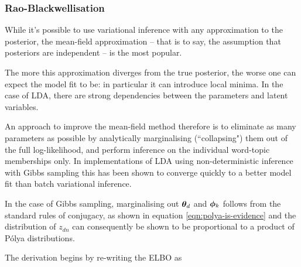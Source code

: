 \subsubsection{Rao-Blackwellisation}
While it's possible to use variational inference with any approximation to the posterior, the mean-field approximation -- that is to say, the assumption that posteriors are independent -- is the most popular. 

The more this approximation diverges from the true posterior, the worse one can expect the model fit to be: in particular it can introduce local minima\cite{WainwrightJordan2008}. In the case of LDA, there are strong dependencies between the parameters and latent variables.

An approach to improve the mean-field method therefore is to eliminate as many parameters as possible by analytically marginalising (``collapsing") them out of the full log-likelihood, and perform inference on the individual word-topic memberships only. In implementations of LDA using non-deterministic inference with Gibbs sampling\cite{Griffiths2004} this has been shown to converge quickly to a better model fit than batch variational inference\cite{Asuncion2012}.

In the case of Gibbs sampling, marginalising out ${ \bm \theta_d }$ and $\bm \phi_k$ follows from the standard rules of conjugacy, as shown in equation \eqref{eqn:polya-is-evidence} and the distribution of $z_{dn}$ can consequently be shown\cite{Griffiths2004}\cite{Heinrich2005} to be proportional to a product of P\'olya distributions.

The derivation begins by re-writing the ELBO as


